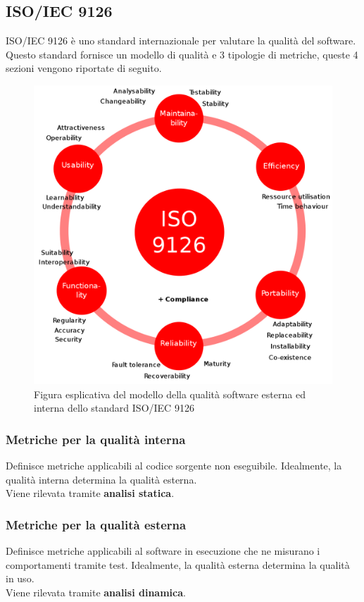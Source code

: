 \subsection{ISO/IEC 9126}
ISO/IEC 9126 è uno standard internazionale per valutare la qualità del software.\\
Questo standard fornisce un modello di qualità e 3 tipologie di metriche, queste 4 sezioni vengono riportate di seguito.\\
\begin{figure}[h!]
	\centering
	\includegraphics[scale=0.15]{res/images/ISO_9126.png}
	\caption{Figura esplicativa del modello della qualità software esterna ed interna dello standard ISO/IEC 9126}
\end{figure}
\subsubsection{Metriche per la qualità interna}
Definisce metriche applicabili al codice sorgente non eseguibile. Idealmente, la qualità interna determina la qualità esterna.\\
Viene rilevata tramite \textbf{analisi statica}.
\subsubsection{Metriche per la qualità esterna}
Definisce metriche applicabili al software in esecuzione che ne misurano i comportamenti tramite test. Idealmente, la qualità esterna determina la qualità in uso.\\
Viene rilevata tramite \textbf{analisi dinamica}.
